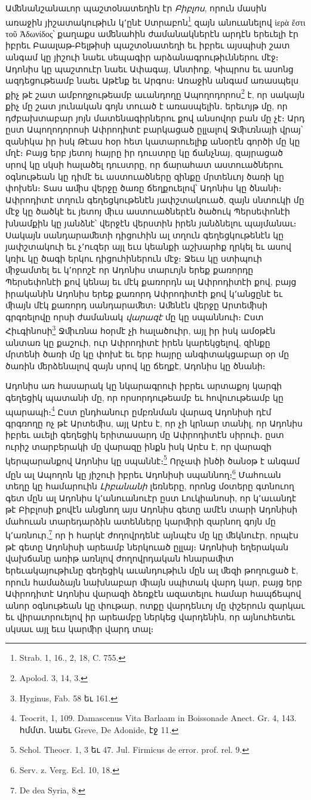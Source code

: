 \documentclass{article}
\begin{document}
{Աﬔնանշանաւոր պաշտօնատեղին էր \emph{Բիբլոս}, որուն մասին առաջին յիշատակութիւն կ՚ընէ Ստրաբոն\footnote{Strab. 1, 16., 2, 18, C. 755.} զայն անուանելով ἱερὰ ἔστι τοῦ Ἀδωνίδος՝ քաղաքս աﬔնահին ժամանակներէն արդէն երեւելի էր իբրեւ Բաալաթ֊Բելթիսի պաշտօնատեղի եւ իբրեւ այսպիսի շատ անգամ կը յիշուի նաեւ սեպագիր արձանագրութիւններու մէջ։ Ադոնիս կը պաշտուէր նաեւ Ափագայ, Անտիոք, Կիպրոս եւ ասոնց ազդեցութեամբ նաեւ Աթէնք եւ Արգոս։ Առաջին անգամ առասպելս քիչ թէ շատ ամբողջութեամբ աւանդողը Ապողոդորոս\footnote{Apolod. 3, 14, 3.} է, որ սակայն քիչ մը շատ յունական գոյն տուած է առասպելին․ երեւոյթ մը, որ դժբախտաբար յոյն մատենագիրներու քով անսովոր բան մը չէ։ Արդ ըստ Ապողոդորոսի Ափրոդիտէ բարկացած ըլլալով Ջﬕւռնայի վրայ՝ զանիկա իր իսկ Թէաս հօր հետ կատարուելիք անօրէն գործի մը կը մղէ։ Բայց երբ յետոյ հայրը իր դուստրը կը ճանչնայ, զայրացած սրով կը սկսի հալածել դուստրը, որ ճարահատ աստուածներու օգնութեան կը դիմէ եւ աստուածները զինքը մրտենւոյ ծառի կը փոխեն։ Տաս աﬕս վերջը ծառը ճեղքուելով՝ Ադոնիս կը ծնանի։ Ափրոդիտէ տղուն գեղեցկութենէն յափշտակուած, զայն սնտուկի մը մէջ կը ծածկէ եւ յետոյ ﬕւս աստուածներէն ծածուկ Պերսեփոնէի խնամքին կը յանձնէ՝ վերջէն վերստին իրեն յանձնելու պայմանաւ։ Սակայն սանդարաﬔտի դիցուհին ալ տղուն գեղեցկութենէն կը յափշտակուի եւ չ՚ուզեր այլ եւս կեանքի աշխարհք ղրկել եւ ասով կռիւ կը ծագի երկու դիցուհիներուն մէջ։ Ջեւս կը ստիպուի ﬕջամտել եւ կ՚որոշէ որ Ադոնիս տարւոյն երեք քառորդը Պերսեփոնէի քով կենայ եւ մէկ քառորդն ալ Ափրոդիտէի քով, բայց իրականին Ադոնիս երեք քառորդ Ափրոդիտէի քով կ՚անցընէ եւ ﬕայն մէկ քառորդ սանդարաﬔտ։ Աﬔնէն վերջը Արտեﬕսի գրգռելովը որսի ժամանակ \emph{վարազէ} մը կը սպաննուի։ Ըստ Հիւգինոսի\footnote{Hyginus, Fab. 58 եւ 161.} Ջﬕւռնա հօրմէ չի հալածուիր, այլ իր իսկ ամօթէն անտառ կը քաշուի, ուր Ափրոդիտէ իրեն կարեկցելով, զինքը մրտենի ծառի մը կը փոխէ եւ երբ հայրը անգիտակցաբար օր մը ծառին ﬔրձենալով զայն սրով կը ճեղքէ, Ադոնիս կը ծնանի։

Ադոնիս առ հասարակ կը նկարագրուի իբրեւ արտաքոյ կարգի գեղեցիկ պատանի մը, որ որսորդութեամբ եւ հովուութեամբ կը պարապի։\footnote{Teocrit, 1, 109. Damascenus Vita Barlaam in Boissonade Anect. Gr. 4, 143. հմմտ․ նաեւ Greve, De Adonide, էջ 11.} Ըստ ընդհանուր ըմբռնման վարազ Ադոնիսի դէմ գրգռողը ոչ թէ Արտեﬕս, այլ Արէս է, որ չի կրնար տանիլ, որ Ադոնիս իբրեւ աւելի գեղեցիկ երիտասարդ մը Ափրոդիտէն սիրուի․ ըստ ուրիշ տարբերակի մը վարազը ինքն իսկ Արէս է, որ վարազի կերպարանքով Ադոնիս կը սպաննէ։\footnote{Schol. Theocr. 1, 3 եւ 47. Jul. Firmicus de error. prof. rel. 9.} Որչափ ինծի ծանօթ է անգամ մըն ալ Ապողոն կը յիշուի իբրեւ Ադոնիսի սպաննող։\footnote{Serv. z. Verg. Ecl. 10, 18.} Մահուան տեղը կը համարուին \emph{Լիբանանի} լեռները, որոնց մօտերը գտնուող գետ մըն ալ Ադոնիս կ՚անուանուէր ըստ Լուկիանոսի, որ կ՚աւանդէ թէ Բիբլոսի քովէն անցնող այս Ադոնիս գետը ամէն տարի Ադոնիսի մահուան տարեդարձին ատենները կարﬕրի զարնող գոյն մը կ՚առնուր,\footnote{De dea Syria, 8.} որ ի հարկէ ժողովրդենէ այնպէս մը կը ﬔկնուէր, որպէս թէ գետը Ադոնիսի արեամբ ներկուած ըլլայ։ Ադոնիսի եղերական վախճանը առիթ առնլով ժողովրդական հնարաﬕտ երեւակայութիւնը գեղեցիկ աւանդութիւն մըն ալ ﬔզի թողուցած է, որուն համաձայն նախնաբար ﬕայն սպիտակ վարդ կար, բայց երբ Ափրոդիտէ Ադոնիս վարազի ձեռքէն ազատելու համար հապճեպով անոր օգնութեան կը փութար, ոտքը վարդենւոյ մը փշերուն զարկաւ եւ վիրաւորուելով իր արեամբը ներկեց վարդենին, որ այնուհետեւ սկսաւ այլ եւս կարﬕր վարդ տալ։

}
\end{document}
